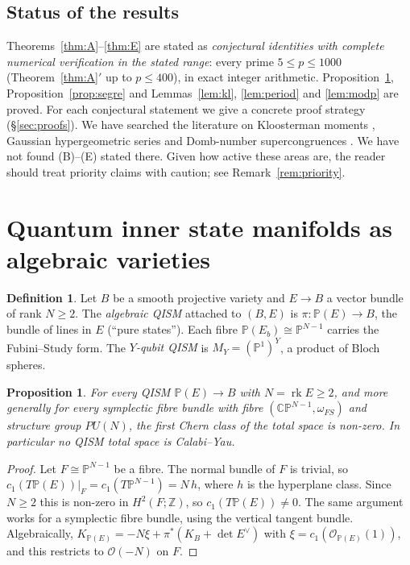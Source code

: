 \documentclass[11pt]{amsart}
\newtheorem{proposition}[theorem]{Proposition}
\theoremstyle{definition}
\newtheorem{definition}[theorem]{Definition}
\newcommand{\Z}{\mathbb{Z}}
\newcommand{\PP}{\mathbb{P}}
\begin{document}
\subsection*{Status of the results}
Theorems~\ref{thm:A}--\ref{thm:E} are stated as \emph{conjectural identities with complete numerical verification in the stated range}: every prime $5\le p\le 1000$ (Theorem~\ref{thm:A}$'$ up to $p\le400$), in exact integer arithmetic. Proposition~\ref{prop:noCY}, Proposition~\ref{prop:segre} and Lemmas~\ref{lem:kl}, \ref{lem:period} and \ref{lem:modp} are proved. For each conjectural statement we give a concrete proof strategy (\S\ref{sec:proofs}). We have searched the literature on Kloosterman moments \cite{Livne,PTV,HSGS,Yun,FSY}, Gaussian hypergeometric series \cite{AO,Kilbourn} and Domb-number supercongruences \cite{MS,CCL}. We have not found (B)--(E) stated there. Given how active these areas are, the reader should treat priority claims with caution; see Remark~\ref{rem:priority}.

\section{Quantum inner state manifolds as algebraic varieties}

\begin{definition}
Let $B$ be a smooth projective variety and $E\to B$ a vector bundle of rank $N\ge2$. The \emph{algebraic QISM} attached to $(B,E)$ is $\pi:\PP(E)\to B$, the bundle of lines in $E$ (``pure states''). Each fibre $\PP(E_b)\cong\PP^{N-1}$ carries the Fubini--Study form. The \emph{$Y$-qubit QISM} is $M_Y=(\PP^1)^Y$, a product of Bloch spheres.
\end{definition}

\begin{proposition}\label{prop:noCY}
For every QISM $\PP(E)\to B$ with $N=\operatorname{rk}E\ge2$, and more generally for every symplectic fibre bundle with fibre $(\mathbb{CP}^{N-1},\omega_{FS})$ and structure group $PU(N)$, the first Chern class of the total space is non-zero. In particular no QISM total space is Calabi--Yau.
\end{proposition}

\begin{proof}
Let $F\cong\PP^{N-1}$ be a fibre. The normal bundle of $F$ is trivial, so $c_1(T\PP(E))|_F=c_1(T\PP^{N-1})=N\,h$, where $h$ is the hyperplane class. Since $N\ge 2$ this is non-zero in $H^2(F;\Z)$, so $c_1(T\PP(E))\ne0$. The same argument works for a symplectic fibre bundle, using the vertical tangent bundle. Algebraically, $K_{\PP(E)}=-N\xi+\pi^*(K_B+\det E^\vee)$ with $\xi=c_1(\mathcal O_{\PP(E)}(1))$, and this restricts to $\mathcal O(-N)$ on $F$.
\end{proof}
\end{document}
